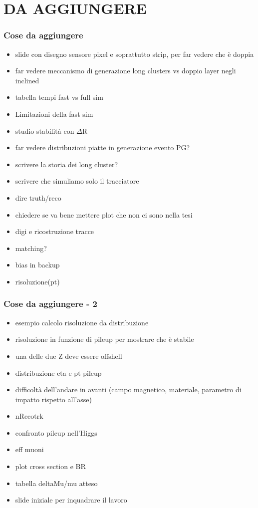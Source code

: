 \documentclass{beamer}
\begin{document}

\section{DA AGGIUNGERE}
\begin{frame}
\frametitle{Cose da aggiungere}
\begin{itemize}
\item slide con disegno sensore pixel e soprattutto strip, per far vedere che \`e doppia
\item far vedere meccanismo di generazione long clusters vs doppio layer negli inclined
\item tabella tempi fast vs full sim
\item Limitazioni della fast sim
\item studio stabilit\`a con $\Delta$R
\item far vedere distribuzioni piatte in generazione evento PG?
\item scrivere la storia dei long cluster?
\item scrivere che simuliamo solo il tracciatore
\item dire truth/reco
\item chiedere se va bene mettere plot che non ci sono nella tesi
\item digi e ricostruzione tracce
\item matching?
\item bias in backup
\item risoluzione(pt)
\end{itemize}
\end{frame}

\begin{frame}
\frametitle{Cose da aggiungere - 2}
\begin{itemize}
\item esempio calcolo risoluzione da distribuzione
\item risoluzione in funzione di pileup per mostrare che \`e stabile
\item una delle due Z deve essere offshell
\item distribuzione eta e pt pileup
\item difficolt\`a dell'andare in avanti (campo magnetico, materiale, parametro di impatto rispetto all'asse)
\item nRecotrk
\item confronto pileup nell'Higgs
\item eff muoni
\item plot cross section e BR
\item tabella deltaMu/mu atteso
\item slide iniziale per inquadrare il lavoro
\end{itemize}
\end{frame}
\end{document}
